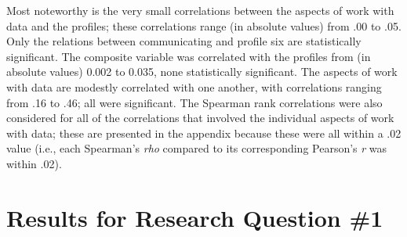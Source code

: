 \documentclass[]{msu-thesis}
\theoremstyle{definition}
\theoremstyle{definition}
\theoremstyle{definition}
\theoremstyle{remark}
\begin{document}
Most noteworthy is the very small correlations between the aspects of
work with data and the profiles; these correlations range (in absolute
values) from .00 to .05. Only the relations between communicating and
profile six are statistically significant. The composite variable was
correlated with the profiles from (in absolute values) 0.002 to 0.035,
none statistically significant. The aspects of work with data are
modestly correlated with one another, with correlations ranging from .16
to .46; all were significant. The Spearman rank correlations were also
considered for all of the correlations that involved the individual
aspects of work with data; these are presented in the appendix because
these were all within a .02 value (i.e., each Spearman's \emph{rho}
compared to its corresponding Pearson's \emph{r} was within .02).

\begin{landscape}\begin{table}

\caption{\label{tab:unnamed-chunk-8}Correlations among study variables}
\centering
{}
\end{table}
\end{landscape}

\section{Results for Research Question
\#1}\label{results-for-research-question-1}
\end{document}
